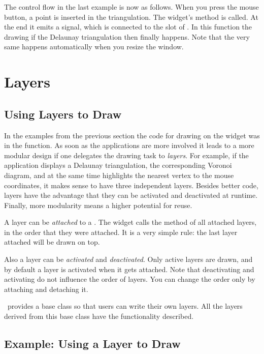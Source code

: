 The control flow in the last example is now as follows. When you press the
mouse button, a point is inserted in the triangulation.  The widget's
method  is called. At the end it emits a signal, which is
connected to the slot of . In this
function the drawing if the Delaunay triangulation then finally
happens.  Note that the very same happens automatically when you
resize the window.

\section{Layers}
\label{Qt_widget_layers}
\subsection{Using Layers to Draw}

In the examples from the previous section the code for drawing on the
widget was in the  function. As soon as the
applications are more involved it leads to a more modular design if
one delegates the drawing task to {\em layers}. For example, if the
application displays a Delaunay triangulation, the corresponding
Voronoi diagram, and at the same time highlights the nearest vertex to
the mouse coordinates, it makes sense to have three independent
layers. Besides better code, layers have the advantage that they can
be activated and deactivated at runtime. Finally, more modularity
means a higher potential for reuse.

A layer can be {\em attached} to a . The widget calls
the method  of all attached layers, in the
order that they were attached. It is a very simple rule: the last layer
attached will be drawn on top.

Also a layer can be {\em activated} and {\em deactivated}. Only active
layers are drawn, and by default a layer is activated when it gets
attached.  Note that deactivating and activating do not influence the
order of layers. You can change the order only by attaching and
detaching it.


\cgal\ provides a base class so that users can write their own
layers. All the layers derived from this base class
 have the functionality described.


\subsection{Example: Using a Layer to Draw}

